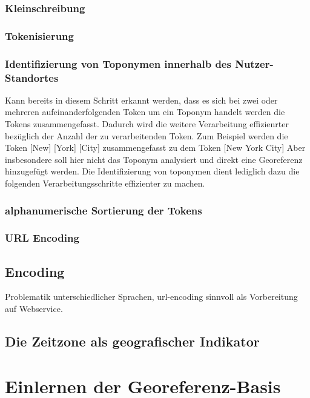 		  	\subsubsection{Kleinschreibung}

		  	\subsubsection{Tokenisierung}

		  	\subsubsection{Identifizierung von Toponymen innerhalb des Nutzer-Standortes}
		  		Kann bereits in diesem Schritt erkannt werden, dass es sich bei zwei oder mehreren aufeinanderfolgenden Token um ein Toponym handelt werden die Tokens zusammengefasst. 
		  		Dadurch wird die weitere Verarbeitung effizienrter bezüglich der Anzahl der zu verarbeitenden Token. 
		  		Zum Beispiel werden die Token [New] [York] [City] zusammengefasst zu dem Token [New York City]  
		  		Aber insbesondere soll hier nicht das Toponym analysiert und direkt eine Georeferenz hinzugefügt werden. 
		  		Die Identifizierung von toponymen dient lediglich dazu die folgenden Verarbeitungsschritte effizienter zu machen. 
		  	

		  	\subsubsection{alphanumerische Sortierung der Tokens}

		  	\subsubsection{URL Encoding}
		  		\subsection{Encoding}
				Problematik unterschiedlicher Sprachen, 
				url-encoding sinnvoll als Vorbereitung auf Webservice. 

		  	

		\subsection{Die Zeitzone als geografischer Indikator}     

	\section{Einlernen der Georeferenz-Basis}

